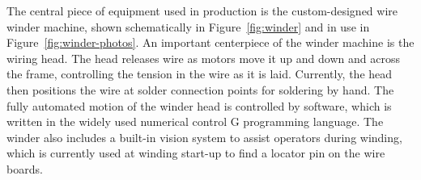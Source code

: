 \begin{comment}
A subset of procedures describing how to perform the step-by-step assembly of an \dword{apa} was originally created prior to the finalization of the \dword{pdsp} \dword{apa} series of drawings, and assigned drawing numbers. During subsequent assemblies, these instructions have evolved due to the addition of better tooling, fixtures, jigs and more complete drawing documents.  The process steps contained in each procedure have also been changed to create a better match with the B.O.M. (Bill Of Materials) contained on each finalized drawing level.  Table~\ref{tab:assembly-docs} lists what documents are available related to each assembly level.  Currently these documents are being revised to reflect the latest evolution of these procedures that were used to assemble USA-\dword{apa}-4 for \dword{pdsp}.

\begin{dunetable}[\dword{apa} assembly documents]{lcc}{tab:assembly-docs}{Procedure documents for \dword{apa} assembly.}   
\dword{apa} Assembly Level & \textbf{Drawing No.} & \textbf{Assembly Instructions Doc.} \\ \toprowrule
\dword{apa} Frame Assembly & 8757 004 & 8752Doc001 \\ 
                   &          & 8752Doc002 \\ \colhline
Comb Base and Mesh & 8757 003 & 8752Doc003 \\
				   &          & 8752Doc004 \\ \colhline
Four Wire Layers   & 8757 002 & ~~~~~8752Doc005 (X) \\
                   &          & ~~~~~8752Doc006 (V) \\
                   &          & ~~~~~8752Doc007 (U) \\
                   &          & ~~~~~8752Doc008 (G) \\ \colhline
Factory \dword{apa}        & 8757 030 & 8752Doc009 \\
                   &          & 8752Doc010 \\ \colhline
Crating for Shipment & being finalized & being finalized \\
\end{dunetable}
\end{comment}

The central piece of equipment used in  production is the custom-designed wire winder machine, shown schematically in Figure~\ref{fig:winder} and in use in Figure~\ref{fig:winder-photos}.  An important centerpiece of the winder machine is the wiring head.  The head releases wire as motors move it up and down and across the frame, controlling the tension in the wire as it is laid. Currently, the head then positions the wire at solder connection points for soldering by hand. The fully automated motion of the winder head is controlled by software, which is written in the widely used numerical control G programming language.  The winder also includes a built-in vision system to assist operators during winding, which is currently used at winding start-up to find a locator pin on the wire boards.  

